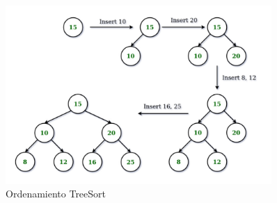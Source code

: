 \documentclass{article}
\begin{document}
\begin{figure}[H]
\centering
\includegraphics[width=0.9\textwidth]{img/treeejem.jpg}
\caption{Ordenamiento TreeSort}
\label{fig:QuickSort}
\end{figure}
\end{document}
